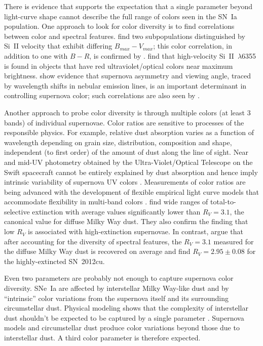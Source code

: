 \documentclass[trackchanges]{aastex62}   	%
\begin{document}
There is evidence that supports the expectation that a single parameter beyond light-curve shape  cannot describe the full range
of colors seen in the SN~Ia population.  One approach to look for color diversity is to find correlations between color and spectral features.
\citet{2009ApJ...699L.139W, 2011ApJ...729...55F} find two subpopulations distinguished
by Si~II velocity that exhibit differing $B_{\mathit{\mathit{max}}}-V_{\mathit{max}}$; this color correlation, in addition to one with $B-R$, is confirmed by
\citet{2014ApJ...797...75M}.
\citet{2009ApJ...699L.139W,2015MNRAS.451.1973S}
find that high-velocity Si~II~$\lambda$6355 is found in objects that have red ultraviolet/optical colors near maximum brightness.
\citet{2011MNRAS.413.3075M} show evidence that supernova asymmetry and viewing angle,
traced by wavelength shifts in nebular emission lines, is an important determinant in controlling supernova color; such correlations are also seen by \citet{2011A&A...534L..15C}.

Another approach to probe color diversity is through multiple colors (at least 3 bands)
of individual supernovae.  Color ratios are sensitive to processes of the responsible physics.   For example,
relative dust absorption varies as a function of wavelength depending on grain size, distribution, composition and shape,
independent (to first order) of the amount of dust along the line of sight.
Near and mid-UV photometry obtained by the Ultra-Violet/Optical Telescope on the Swift spacecraft cannot be entirely explained
by dust absorption and hence imply intrinsic variability of supernova UV colors
\citep{2017ApJ...836..232B}.
Measurements of color ratios are being advanced with the development of flexible empirical light curve models that accommodate flexibility in multi-band colors
\citep[e.g.][]{2011ApJ...731..120M}.
\citet{2014ApJ...789...32B, 2015MNRAS.453.3300A} find wide
ranges of total-to-selective extinction with average values significantly lower than $R_V = 3.1$,
the canonical value for diffuse Milky Way dust.
They also confirm the \citet{2006MNRAS.369.1880E, 2011ApJ...731..120M} finding that low $R_V$ is associated with high-extinction supernovae.
In contrast, \citet{2011A&A...529L...4C} argue that after accounting for the diversity of spectral features,
the $R_V=3.1$ measured for the diffuse Milky Way dust is recovered on average and \citet{2017ApJ...836..157H}
find $R_V=2.95 \pm 0.08$ for the highly-extincted SN~2012cu.

Even two parameters are probably not enough to capture supernova color diversity.  SNe~Ia 
are affected by interstellar Milky Way-like dust  and by ``intrinsic'' color variations from the supernova itself and its surrounding circumstellar dust. Physical modeling
shows that the complexity of interstellar dust shouldn't be expected to be captured by a single parameter \citep{2015ApJ...807L..26G,
2017ApJ...836...13H}. Supernova models \citep[e.g.][]{2007ApJ...662..487W,2013MNRAS.436..333S,2014MNRAS.441..532D,2015MNRAS.454.2549B,
2017ApJ...846...58H} and circumstellar dust \citep{2005ApJ...635L..33W,
2008ApJ...686L.103G} produce color variations beyond those due to interstellar dust.  A third color
parameter is therefore expected.
\end{document}
